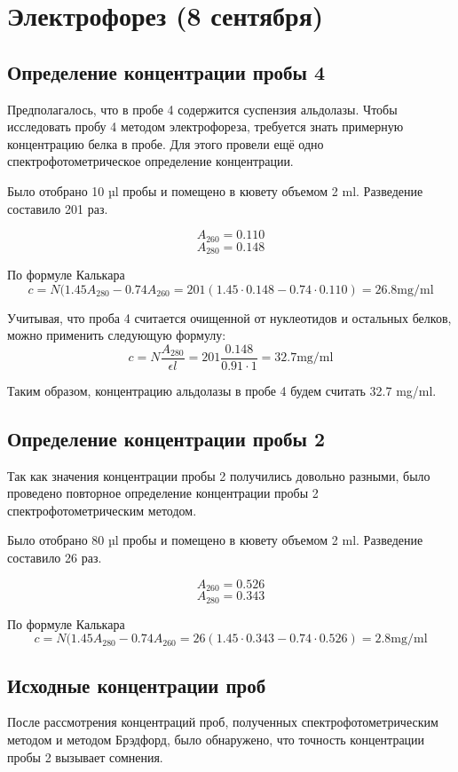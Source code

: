 \section{Электрофорез (8 сентября)}
\subsection{Определение концентрации пробы 4}
Предполагалось, что в пробе 4 содержится суспензия альдолазы.
Чтобы исследовать пробу 4 методом электрофореза,
требуется знать примерную концентрацию белка в пробе.
Для этого провели ещё одно спектрофотометрическое определение концентрации.

Было отобрано 10 µl пробы и помещено в кювету объемом 2 ml.
Разведение составило 201 раз.

$$ A_{260} = 0.110 $$
$$ A_{280} = 0.148 $$

По формуле Калькара
$$ c = N (1.45 A_{280} - 0.74 A_{260} = 201 (1.45 \cdot 0.148 - 0.74 \cdot 0.110) = 26.8 \text{mg/ml}$$

Учитывая, что проба 4 считается очищенной от нуклеотидов и остальных белков,
можно применить следующую формулу:
$$ c = N \frac{A_{280}}{\epsilon l} = 201 \frac{0.148}{0.91 \cdot 1} = 32.7 \text{mg/ml}$$

Таким образом, концентрацию альдолазы в пробе 4 будем считать 32.7 mg/ml.

\subsection{Определение концентрации пробы 2}
Так как значения концентрации пробы 2 получились довольно разными,
было проведено повторное определение концентрации пробы 2 спектрофотометрическим методом.

Было отобрано 80 µl пробы и помещено в кювету объемом 2 ml.
Разведение составило 26 раз.

$$ A_{260} = 0.526 $$
$$ A_{280} = 0.343 $$

По формуле Калькара
$$ c = N (1.45 A_{280} - 0.74 A_{260} = 26 (1.45 \cdot 0.343 - 0.74 \cdot 0.526) = 2.8 \text{mg/ml}$$

\subsection{Исходные концентрации проб}
После рассмотрения концентраций проб, полученных спектрофотометрическим методом
и методом Брэдфорд, было обнаружено, что точность концентрации пробы 2 вызывает
сомнения.

